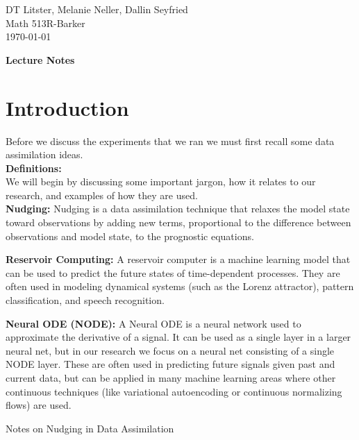 \documentclass[12pt,oneside]{article}
\newcommand{\defEx}[2]{\textbf{#1} #2}
\theoremstyle{plain}
\begin{document}
\begin{flushright}
\normalsize{DT Litster, Melanie Neller, Dallin Seyfried}  \\
Math 513R-Barker\\
\today
\end{flushright}

\begin{center}
\LARGE \textbf{Lecture Notes} \\
\end{center}

\section{Introduction}

\noindent\normalsize{Before we discuss the experiments that we ran we must first recall some data assimilation ideas.}\\


\noindent\large\textbf{Definitions:}\\
\noindent\normalsize{We will begin by discussing some important jargon, how it relates to our research, and examples of how they are used.}\\ 


\defEx{Nudging:}
{Nudging is a data assimilation technique that relaxes the model state toward observations by adding new terms, proportional to the difference between observations and model state, to the prognostic equations.}

\defEx{Reservoir Computing:}
{A reservoir computer is a machine learning model that can be used to predict the future states of time-dependent processes.  They are often used in modeling dynamical systems (such as the Lorenz attractor), pattern classification, and speech recognition.}

\defEx{Neural ODE (NODE):}
{
A Neural ODE is a neural network used to approximate the derivative of a signal. It can be used as a single layer in a larger neural net, but in our research we focus on a neural net consisting of a single NODE layer. These are often used in predicting future signals given past and current data, but can be applied in many machine learning areas where other continuous techniques (like variational autoencoding or continuous normalizing flows) are used.
}

\pagebreak


\begin{center}
    \LARGE Notes on Nudging in Data Assimilation \\
\end{center}
\end{document}
